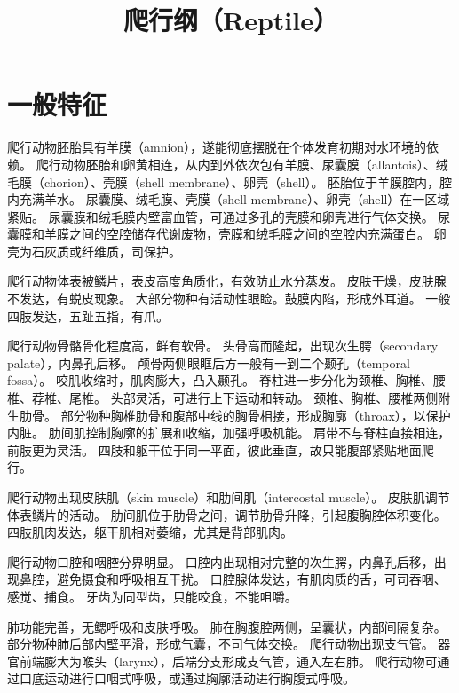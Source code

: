 \documentclass[11pt]{article}
\title{爬行纲（Reptile）}
\date{}
\begin{document}
  \maketitle

  \linenumbers
\section{一般特征}
爬行动物胚胎具有羊膜（amnion），遂能彻底摆脱在个体发育初期对水环境的依赖。
爬行动物胚胎和卵黄相连，从内到外依次包有羊膜、尿囊膜（allantois）、绒毛膜（chorion）、壳膜（shell membrane）、卵壳（shell）。
胚胎位于羊膜腔内，腔内充满羊水。
尿囊膜、绒毛膜、壳膜（shell membrane）、卵壳（shell）在一区域紧贴。
尿囊膜和绒毛膜内壁富血管，可通过多孔的壳膜和卵壳进行气体交换。
尿囊膜和羊膜之间的空腔储存代谢废物，壳膜和绒毛膜之间的空腔内充满蛋白。
卵壳为石灰质或纤维质，司保护。

\newline

爬行动物体表被鳞片，表皮高度角质化，有效防止水分蒸发。
皮肤干燥，皮肤腺不发达，有蜕皮现象。
大部分物种有活动性眼睑。鼓膜内陷，形成外耳道。
一般四肢发达，五趾五指，有爪。

\newline

爬行动物骨骼骨化程度高，鲜有软骨。
头骨高而隆起，出现次生腭（secondary palate），内鼻孔后移。
颅骨两侧眼眶后方一般有一到二个颞孔（temporal fossa）。
咬肌收缩时，肌肉膨大，凸入颞孔。
脊柱进一步分化为颈椎、胸椎、腰椎、荐椎、尾椎。
头部灵活，可进行上下运动和转动。
颈椎、胸椎、腰椎两侧附生肋骨。
部分物种胸椎肋骨和腹部中线的胸骨相接，形成胸廓（throax），以保护内脏。
肋间肌控制胸廓的扩展和收缩，加强呼吸机能。
肩带不与脊柱直接相连，前肢更为灵活。
四肢和躯干位于同一平面，彼此垂直，故只能腹部紧贴地面爬行。

\newline

爬行动物出现皮肤肌（skin muscle）和肋间肌（intercostal muscle）。
皮肤肌调节体表鳞片的活动。
肋间肌位于肋骨之间，调节肋骨升降，引起腹胸腔体积变化。
四肢肌肉发达，躯干肌相对萎缩，尤其是背部肌肉。

\newline

爬行动物口腔和咽腔分界明显。
口腔内出现相对完整的次生腭，内鼻孔后移，出现鼻腔，避免摄食和呼吸相互干扰。
口腔腺体发达，有肌肉质的舌，可司吞咽、感觉、捕食。
牙齿为同型齿，只能咬食，不能咀嚼。

\newline

肺功能完善，无鳃呼吸和皮肤呼吸。
肺在胸腹腔两侧，呈囊状，内部间隔复杂。
部分物种肺后部内壁平滑，形成气囊，不司气体交换。
爬行动物出现支气管。
器官前端膨大为喉头（larynx），后端分支形成支气管，通入左右肺。
爬行动物可通过口底运动进行口咽式呼吸，或通过胸廓活动进行胸腹式呼吸。
\end{document}

